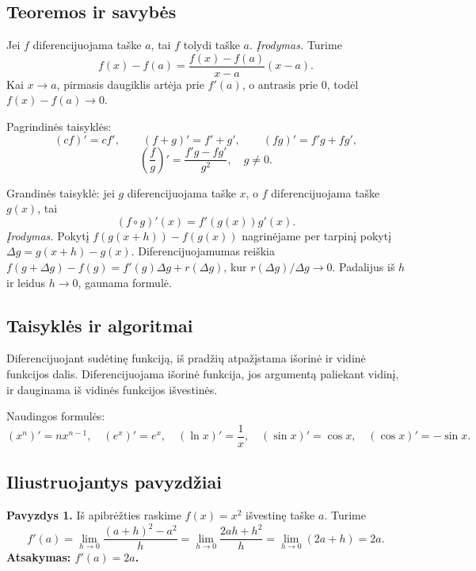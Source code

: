 \subsection{Teoremos ir savybės}

\begin{teorema}
Jei $f$ diferencijuojama taške $a$, tai $f$ tolydi taške $a$.
\emph{Įrodymas.} Turime
\[
f(x)-f(a)=\frac{f(x)-f(a)}{x-a}(x-a).
\]
Kai $x\to a$, pirmasis daugiklis artėja prie $f'(a)$, o antrasis prie $0$, todėl $f(x)-f(a)\to0$.
\end{teorema}

\begin{savybe}
Pagrindinės taisyklės:
\[
(cf)'=cf',\qquad (f+g)'=f'+g',\qquad (fg)'=f'g+fg',
\]
\[
\left(\frac{f}{g}\right)'=\frac{f'g-fg'}{g^2},\quad g\ne0.
\]
\end{savybe}

\begin{teorema}
Grandinės taisyklė: jei $g$ diferencijuojama taške $x$, o $f$ diferencijuojama taške $g(x)$, tai
\[
(f\circ g)'(x)=f'(g(x))g'(x).
\]
\emph{Įrodymas.} Pokytį $f(g(x+h))-f(g(x))$ nagrinėjame per tarpinį pokytį $\Delta g=g(x+h)-g(x)$. Diferencijuojamumas reiškia $f(g+\Delta g)-f(g)=f'(g)\Delta g+r(\Delta g)$, kur $r(\Delta g)/\Delta g\to0$. Padalijus iš $h$ ir leidus $h\to0$, gaunama formulė.
\end{teorema}

\subsection{Taisyklės ir algoritmai}

Diferencijuojant sudėtinę funkciją, iš pradžių atpažįstama išorinė ir vidinė funkcijos dalis. Diferencijuojama išorinė funkcija, jos argumentą paliekant vidinį, ir dauginama iš vidinės funkcijos išvestinės.

Naudingos formulės:
\[
(x^n)'=nx^{n-1},\quad (e^x)'=e^x,\quad (\ln x)'=\frac1x,\quad (\sin x)'=\cos x,\quad (\cos x)'=-\sin x.
\]

\subsection{Iliustruojantys pavyzdžiai}

\textbf{Pavyzdys 1.} Iš apibrėžties raskime $f(x)=x^2$ išvestinę taške $a$. Turime
\[
f'(a)=\lim_{h\to0}\frac{(a+h)^2-a^2}{h}
=\lim_{h\to0}\frac{2ah+h^2}{h}
=\lim_{h\to0}(2a+h)=2a.
\]
\textbf{Atsakymas: $f'(a)=2a$.}

